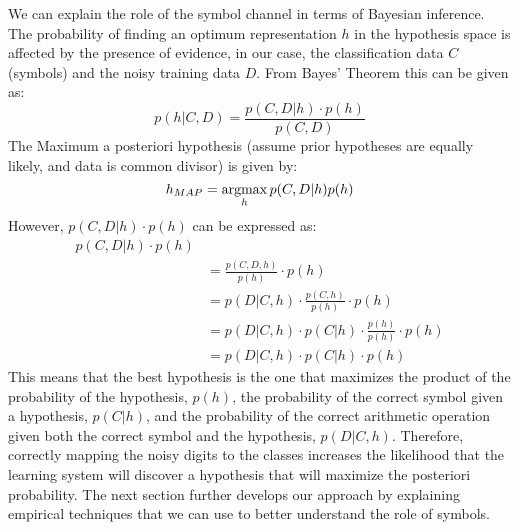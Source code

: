 We can explain the role of the symbol channel in terms of Bayesian inference. The probability of finding an optimum representation $h$ in the hypothesis space is affected by the presence of evidence, in our case, the classification data $C$ (symbols) and the noisy training data $D$. From Bayes' Theorem this can be given as:
\begin{equation}
p(h|C,D) = \frac{p(C,D|h) \cdot p(h)}{p(C,D)}
\end{equation}
The Maximum a posteriori hypothesis (assume prior hypotheses are equally likely, and data is common divisor) is given by:
\begin{equation}
h_{MAP} = \operatorname*{argmax}_h p(C,D|h) p(h)
\end{equation}
However, $p(C,D|h) \cdot p(h)$ can be expressed as:
\begin{equation}
\begin{split}
p(C,D|h) \cdot p(h)\\
& = \frac{p(C,D,h)}{p(h)} \cdot p(h)\\
& = p(D | C, h) \cdot \frac{p(C, h)}{p(h)} \cdot p(h)\\
& = p(D | C, h) \cdot p(C |h) \cdot \frac{p(h)}{p(h)} \cdot p(h)\\
& = p(D | C, h) \cdot p(C |h) \cdot p(h)
\end{split}
\end{equation}
This means that the best hypothesis is the one that maximizes the product of the probability of the hypothesis, $p(h)$, the probability of the correct symbol given a hypothesis, $p(C |h)$, and the probability of the correct arithmetic operation given both the correct symbol and the hypothesis, $p(D | C, h)$\cite{wiki:Bayesian_inference}. Therefore, correctly mapping the noisy digits to the classes increases the likelihood that the learning system will discover a hypothesis that will maximize the posteriori probability. The next section further develops our approach by explaining empirical techniques that we can use to better understand the role of symbols.   